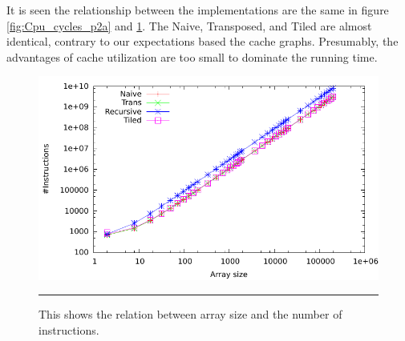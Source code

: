 It is seen the relationship between the implementations are the same in figure \ref{fig:Cpu_cycles_p2a} and \ref{fig:Instructions_p2a}.
The Naive, Transposed, and Tiled are almost identical, contrary to our expectations based the cache graphs.
Presumably, the advantages of cache utilization are too small to dominate the running time.

\begin{figure}[htbp]
	\centering
		\includegraphics[width=\textwidth]{./Figures/Project2a/Instructions.pdf}
		\rule{35em}{0.5pt}
	\caption[Instructions]{
	This shows the relation between array size and the number of instructions.
	}
	\label{fig:Instructions_p2a}
\end{figure}
